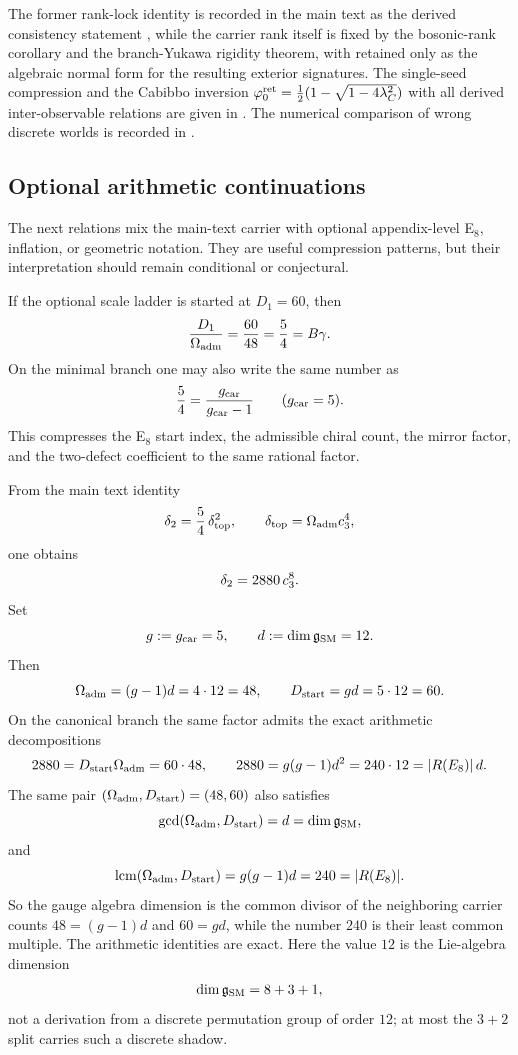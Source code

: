 \begin{remark}
The former rank-lock identity is recorded in the main text as the derived consistency statement
, while the carrier rank itself is fixed by the bosonic-rank corollary and the
branch-Yukawa rigidity theorem, with  retained only as the
algebraic normal form for the resulting exterior signatures.
The single-seed compression and the Cabibbo inversion $\varphi_0^{\mathrm{ret}}=\frac12(1-\sqrt{1-4\lambda_C^2})$
with all derived inter-observable relations are given in
. The numerical
comparison of wrong discrete worlds is recorded in .
\end{remark}

\subsection{Optional arithmetic continuations}

The next relations mix the main-text carrier with optional appendix-level E$_8$, inflation, or geometric notation. They are useful compression patterns, but their interpretation should remain conditional or conjectural.

\begin{remark}
If the optional scale ladder is started at $D_1=60$, then
\[
\frac{D_1}{\Omega_{\mathrm{adm}}}=\frac{60}{48}=\frac54=B\gamma.
\]
On the minimal branch one may also write the same number as
\[
\frac54=\frac{g_{\mathrm{car}}}{g_{\mathrm{car}}-1}\qquad (g_{\mathrm{car}}=5).
\]
This compresses the E$_8$ start index, the admissible chiral count, the mirror factor, and the two-defect coefficient to the same rational factor.
\end{remark}

\begin{corollary}\label{rem:defect-factorization-gcd-lcm}
From the main text identity
\[
\delta_2=\frac{5}{4}\,\delta_{\mathrm{top}}^2,
\qquad
\delta_{\mathrm{top}}=\Omega_{\mathrm{adm}}c_3^4,
\]
one obtains
\[
\delta_2=2880\,c_3^8.
\]
Set
\[
g:=g_{\mathrm{car}}=5,
\qquad
d:=\dim\mathfrak g_{\mathrm{SM}}=12.
\]
Then
\[
\Omega_{\mathrm{adm}}=(g-1)d=4\cdot 12=48,
\qquad
D_{\mathrm{start}}=gd=5\cdot 12=60.
\]
On the canonical branch the same factor admits the exact arithmetic decompositions
\[
2880=D_{\mathrm{start}}\Omega_{\mathrm{adm}}=60\cdot48,
\qquad
2880=g(g-1)d^2=240\cdot12=|R(E_8)|\,d.
\]
The same pair $(\Omega_{\mathrm{adm}},D_{\mathrm{start}})=(48,60)$ also satisfies
\[
\gcd(\Omega_{\mathrm{adm}},D_{\mathrm{start}})
=
d=\dim \mathfrak g_{\mathrm{SM}},
\]
and
\[
\operatorname{lcm}(\Omega_{\mathrm{adm}},D_{\mathrm{start}})
=
g(g-1)d
=
240
=
|R(E_8)|.
\]
So the gauge algebra dimension is the common divisor of the neighboring carrier counts
$48=(g-1)d$ and $60=gd$, while the number $240$ is their least common multiple. The arithmetic
identities are exact. Here the value $12$ is the Lie-algebra dimension
\[
\dim\mathfrak g_{\mathrm{SM}}=8+3+1,
\]
not a derivation from a discrete permutation group of order $12$; at most the $3+2$ split carries
such a discrete shadow.
\end{corollary}

